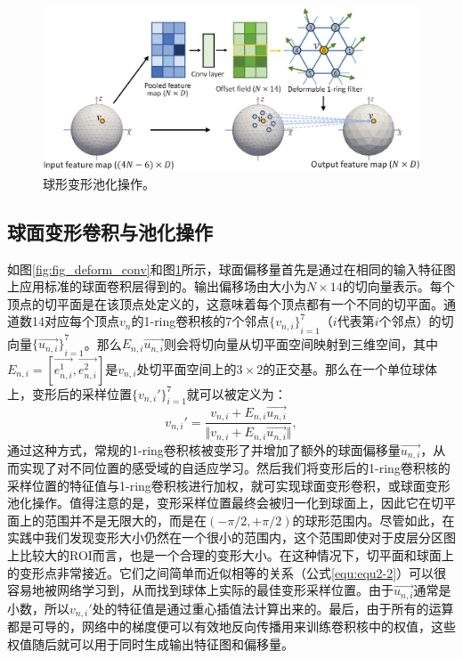 \begin{figure}[t]
	\centering
	\includegraphics[width=0.85\linewidth]{figure/spheircal_deform_pool.eps}
	\caption{球形变形池化操作。}
	\label{fig:fig_deform_pool}
\end{figure}

\subsection{球面变形卷积与池化操作}
如图\ref{fig:fig_deform_conv}和图\ref{fig:fig_deform_pool}所示，球面偏移量首先是通过在相同的输入特征图上应用标准的球面卷积层得到的。输出偏移场由大小为$N\times 14$的切向量表示。每个顶点的切平面是在该顶点处定义的，这意味着每个顶点都有一个不同的切平面。通道数14对应每个顶点$v_n$的1-ring卷积核的7个邻点${\{v_{n,i}\}}_{i=1}^7$（$i$代表第$i$个邻点）的切向量${\{\overrightarrow{u_{n,i}}\}}_{i=1}^7$。那么$E_{n,i}\overrightarrow{u_{n,i}}$则会将切向量从切平面空间映射到三维空间，其中$E_{n,i}=[\overrightarrow{e_{n,i}^1},\overrightarrow{e_{n,i}^2}]$是$v_{n,i}$处切平面空间上的$3\times 2$的正交基。那么在一个单位球体上，变形后的采样位置$\{v_{n,i}'\}_{i=1}^7$就可以被定义为：
\begin{equation}\label{equ:equ2-2}
v_{n,i}'=\frac{v_{n,i}+E_{n,i}\overrightarrow{u_{n,i}}}{\Vert v_{n,i}+E_{n,i}\overrightarrow{u_{n,i}}\Vert},
\end{equation}
通过这种方式，常规的1-ring卷积核被变形了并增加了额外的球面偏移量$\overrightarrow{u_{n,i}}$，从而实现了对不同位置的感受域的自适应学习。然后我们将变形后的1-ring卷积核的采样位置的特征值与1-ring卷积核进行加权，就可实现球面变形卷积，或球面变形池化操作。值得注意的是，变形采样位置最终会被归一化到球面上，因此它在切平面上的范围并不是无限大的，而是在$(-\pi/2,+\pi/2)$的球形范围内。尽管如此，在实践中我们发现变形大小仍然在一个很小的范围内，这个范围即使对于皮层分区图上比较大的ROI而言，也是一个合理的变形大小。在这种情况下，切平面和球面上的变形点非常接近。它们之间简单而近似相等的关系（公式\ref{equ:equ2-2}）可以很容易地被网络学习到，从而找到球体上实际的最佳变形采样位置。由于$\overrightarrow{u_{n,i}}$通常是小数，所以$v_{n,i}'$处的特征值是通过重心插值法\cite{yeo2009spherical}计算出来的。最后，由于所有的运算都是可导的，网络中的梯度便可以有效地反向传播用来训练卷积核中的权值，这些权值随后就可以用于同时生成输出特征图和偏移量。


